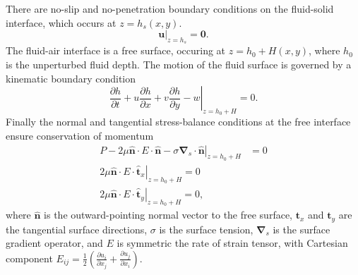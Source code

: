 \documentclass[aps,pre,amsmath,amssymb,floatfix,onecolumn,notitlepage,10pt]{revtex4-1}
\begin{document}
There are no-slip and no-penetration boundary conditions on the fluid-solid interface, which occurs at $z=h_s(x,y)$.
\begin{equation}
\left. \mathbf{u} \right\rvert_{z=h_s} = \mathbf{0}. \label{noslip}
\end{equation}
The fluid-air interface is a free surface, occuring at $z=h_0 + H(x,y)$, where $h_0$ is the unperturbed fluid depth. The motion of the fluid surface is governed by a kinematic boundary condition
\begin{equation}
\left. \frac{\partial h}{\partial t} + u \frac{\partial h}{\partial x} + v\frac{\partial h}{\partial y} - w \right\rvert_{z=h_0+H} = 0. \label{kinematic}
\end{equation}
Finally the normal and tangential stress-balance conditions at the free interface ensure conservation of momentum
\begin{align}
\left. P - 2\mu \hat{\mathbf{n}} \cdot E \cdot \hat{\mathbf{n}} - \sigma \bm{\nabla}_s \cdot \hat{\mathbf{n}}  \right\rvert_{z=h_0+H} &= 0 \label{normalstress} \\
\left. 2\mu\hat{\mathbf{n}}\cdot E \cdot \hat{\mathbf{t}}_x  \right\rvert_{z=h_0+H} = 0  \label{tangentialstress1} \\
\left. 2\mu\hat{\mathbf{n}}\cdot E \cdot \hat{\mathbf{t}}_y  \right\rvert_{z=h_0+H}  = 0, \label{tangentialstress2}
\end{align}
where $\hat{\mathbf{n}}$ %
is the outward-pointing normal vector to the free surface, $\mathbf{t}_x$ and $\mathbf{t}_y$ are the tangential surface directions, $\sigma$ is the surface tension, $\bm{\nabla}_s$ is the surface gradient operator, and $E$ is symmetric the rate of strain tensor, with Cartesian component $E_{ij} = \frac{1}{2}\left(\frac{\partial u_{i}}{\partial x_j} + \frac{\partial u_{j}}{\partial x_i}\right)$.
\end{document}
